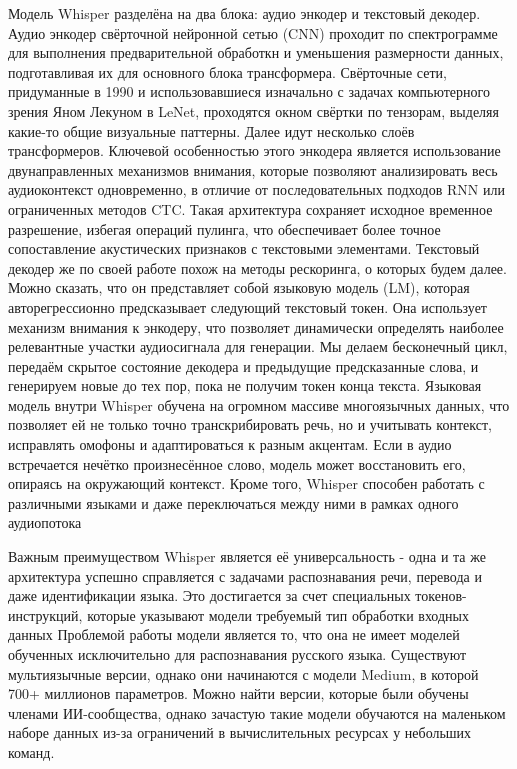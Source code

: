 Модель Whisper разделёна на два блока: аудио энкодер и текстовый декодер.
Аудио энкодер свёрточной нейронной сетью (CNN) проходит по спектрограмме для выполнения предварительной обработкн и уменьшения размерности данных, подготавливая их для основного блока трансформера.
Свёрточные сети, придуманные в 1990 и использовавшиеся изначально с задачах компьютерного зрения Яном Лекуном в LeNet, проходятся окном свёртки по тензорам, выделяя какие-то общие визуальные паттерны.
Далее идут несколько слоёв трансформеров.
Ключевой особенностью этого энкодера является использование двунаправленных механизмов внимания, которые позволяют анализировать весь аудиоконтекст одновременно, в отличие от последовательных подходов RNN или ограниченных методов CTC.
Такая архитектура сохраняет исходное временное разрешение, избегая операций пулинга, что обеспечивает более точное сопоставление акустических признаков с текстовыми элементами.
Текстовый декодер же по своей работе  похож на методы рескоринга, о которых будем далее.
Можно сказать, что он представляет собой языковую модель (LM), которая авторегрессионно предсказывает следующий текстовый токен.
Она использует механизм внимания к энкодеру, что позволяет динамически определять наиболее релевантные участки аудиосигнала для генерации.
Мы делаем бесконечный цикл, передаём скрытое состояние декодера и предыдущие предсказанные слова, и генерируем новые до тех пор, пока не получим токен конца текста.
Языковая модель внутри Whisper обучена на огромном массиве многоязычных данных, что позволяет ей не только точно транскрибировать речь, но и учитывать контекст, исправлять омофоны и адаптироваться к разным акцентам.
Если в аудио встречается нечётко произнесённое слово, модель может восстановить его, опираясь на окружающий контекст.
Кроме того, Whisper способен работать с различными языками и даже переключаться между ними в рамках одного аудиопотока

Важным преимуществом Whisper является её универсальность - одна и та же архитектура успешно справляется с задачами распознавания речи, перевода и даже идентификации языка.
Это достигается за счет специальных токенов-инструкций, которые указывают модели требуемый тип обработки входных данных
Проблемой работы модели является то, что она не имеет моделей обученных исключительно для распознавания русского языка.
Существуют мультиязычные версии, однако они начинаются с модели Medium, в которой 700+ миллионов параметров.
Можно найти версии, которые были обучены членами ИИ-сообщества, однако зачастую такие модели обучаются на маленьком наборе данных из-за ограничений в вычислительных ресурсах у небольших команд.

